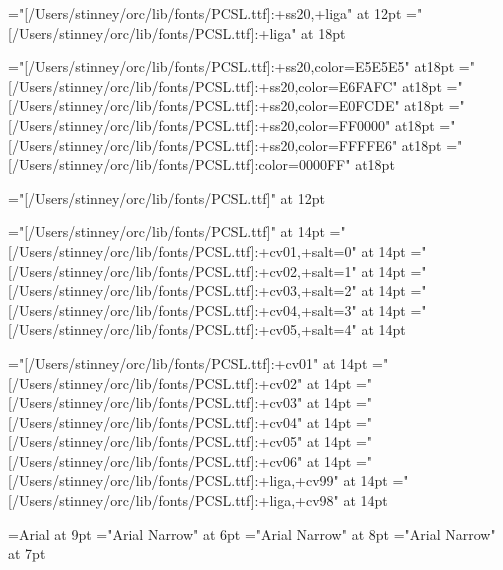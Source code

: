 \font\pcssxxx="[/Users/stinney/orc/lib/fonts/PCSL.ttf]:+ss20,+liga" at 12pt
\font\pcxviii="[/Users/stinney/orc/lib/fonts/PCSL.ttf]:+liga" at 18pt

\font\pceee="[/Users/stinney/orc/lib/fonts/PCSL.ttf]:+ss20,color=E5E5E5" at18pt
\font\pceff="[/Users/stinney/orc/lib/fonts/PCSL.ttf]:+ss20,color=E6FAFC" at18pt
\font\pcefd="[/Users/stinney/orc/lib/fonts/PCSL.ttf]:+ss20,color=E0FCDE" at18pt
\font\pcfee="[/Users/stinney/orc/lib/fonts/PCSL.ttf]:+ss20,color=FF0000" at18pt
\font\pcffe="[/Users/stinney/orc/lib/fonts/PCSL.ttf]:+ss20,color=FFFFE6" at18pt
\font\pcblu="[/Users/stinney/orc/lib/fonts/PCSL.ttf]:color=0000FF" at18pt

\font\pcringop="[/Users/stinney/orc/lib/fonts/PCSL.ttf]" at 12pt

\font\pcseq="[/Users/stinney/orc/lib/fonts/PCSL.ttf]" at 14pt
\font\pcseqi="[/Users/stinney/orc/lib/fonts/PCSL.ttf]:+cv01,+salt=0" at 14pt
\font\pcseqii="[/Users/stinney/orc/lib/fonts/PCSL.ttf]:+cv02,+salt=1" at 14pt
\font\pcseqiii="[/Users/stinney/orc/lib/fonts/PCSL.ttf]:+cv03,+salt=2" at 14pt
\font\pcseqiv="[/Users/stinney/orc/lib/fonts/PCSL.ttf]:+cv04,+salt=3" at 14pt
\font\pcseqv="[/Users/stinney/orc/lib/fonts/PCSL.ttf]:+cv05,+salt=4" at 14pt

\font\pccvi="[/Users/stinney/orc/lib/fonts/PCSL.ttf]:+cv01" at 14pt
\font\pccvii="[/Users/stinney/orc/lib/fonts/PCSL.ttf]:+cv02" at 14pt
\font\pccviii="[/Users/stinney/orc/lib/fonts/PCSL.ttf]:+cv03" at 14pt
\font\pccviv="[/Users/stinney/orc/lib/fonts/PCSL.ttf]:+cv04" at 14pt
\font\pccvv="[/Users/stinney/orc/lib/fonts/PCSL.ttf]:+cv05" at 14pt
\font\pccvvi="[/Users/stinney/orc/lib/fonts/PCSL.ttf]:+cv06" at 14pt
\font\pccvxcix="[/Users/stinney/orc/lib/fonts/PCSL.ttf]:+liga,+cv99" at 14pt
\font\pccvxcviii="[/Users/stinney/orc/lib/fonts/PCSL.ttf]:+liga,+cv98" at 14pt

\font\helv=Arial at 9pt
\font\helvx="Arial Narrow" at 6pt
\font\helvy="Arial Narrow" at 8pt
\font\helvz="Arial Narrow" at 7pt

\def\ofs#1#2#3{}
\let\ofspc\pcxxv
\let\redpc\pcfee
\let\newgh\pcblu

\long{}

\let\pageno\page

\newcount\ltfirstpage








\def\Hstrut{\vrule height12pt depth5pt width0pt}
\def\tvrule{\vrule}
\def\tvrulex{\vrule width1pt\relax}
\def\tablerule{\noalign{\allowbreak\hrule}}
\def\thead{\Sans\nine\rm}
\def\theadrule{\noalign{\hrule height1pt}}
\def\tbodybreak{\noalign{\allowbreak}}

